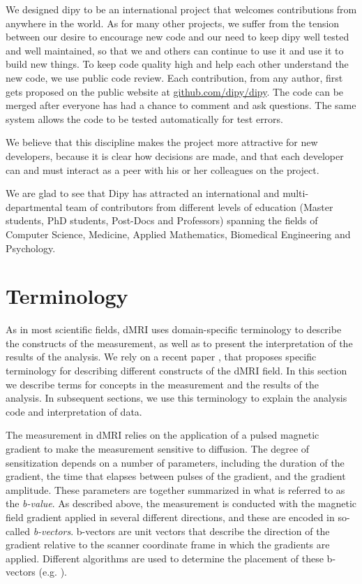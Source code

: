 \documentclass{bioinfo}
\begin{document}
We designed dipy to be an international project that welcomes contributions from
anywhere in the world. As for many other projects, we suffer from the tension
between our desire to encourage new code and our need to keep dipy well tested
and well maintained, so that we and others can continue to use it and use it to
build new things. To keep code quality high and help each other understand the
new code, we use public code review.  Each contribution, from any author, first
gets proposed on the public website at \url{github.com/dipy/dipy}. The code can
be merged after everyone has had a chance to comment and ask questions.  The
same system allows the code to be tested automatically for test errors.

We believe that this discipline makes the project more attractive for new
developers, because it is clear how decisions are made, and that each developer
can and must interact as a peer with his or her colleagues on the project.

We are glad to see that Dipy has attracted an international and
multi-departmental team of contributors from different levels of education
(Master students, PhD students, Post-Docs and Professors) spanning the fields of
Computer Science, Medicine, Applied Mathematics, Biomedical Engineering and
Psychology.


\section{Terminology}

As in most scientific fields, dMRI uses domain-specific
terminology to describe the constructs of the measurement, as well as to
present the interpretation of the results of the analysis. We rely on a recent
paper \citep{Cote2013tractometer}, that proposes specific terminology for
describing different constructs of the dMRI field. In this section we
describe terms for concepts in the measurement and the results of the analysis.
In subsequent sections, we use this terminology to explain the analysis code and
interpretation of data.

The measurement in dMRI relies on the application of a pulsed magnetic gradient
to make the measurement sensitive to diffusion. The degree of sensitization
depends on a number of parameters, including the duration of the
gradient, the time that elapses between pulses of the gradient, and the gradient
amplitude. These parameters are together summarized in what is referred to as
the \emph{b-value}.  As described above, the measurement is conducted with the
magnetic field gradient applied in several different directions, and these are
encoded in so-called \emph{b-vectors}. b-vectors are unit vectors that describe
the direction of the gradient relative to the scanner coordinate frame in which
the gradients are applied. Different algorithms are used to determine the
placement of these b-vectors (e.g. \citep{jones-etal:99, Caruyer2013}).
\end{document}
